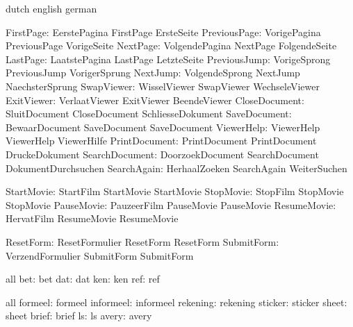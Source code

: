 \startvariables      dutch             english              german

         FirstPage:  EerstePagina      FirstPage            ErsteSeite
      PreviousPage:  VorigePagina      PreviousPage         VorigeSeite
          NextPage:  VolgendePagina    NextPage             FolgendeSeite
          LastPage:  LaatstePagina     LastPage             LetzteSeite
      PreviousJump:  VorigeSprong      PreviousJump         VorigerSprung
          NextJump:  VolgendeSprong    NextJump             NaechsterSprung
        SwapViewer:  WisselViewer      SwapViewer           WechseleViewer
        ExitViewer:  VerlaatViewer     ExitViewer           BeendeViewer
     CloseDocument:  SluitDocument     CloseDocument        SchliesseDokument
      SaveDocument:  BewaarDocument    SaveDocument         SaveDocument %
        ViewerHelp:  ViewerHelp        ViewerHelp           ViewerHilfe
     PrintDocument:  PrintDocument     PrintDocument        DruckeDokument
    SearchDocument:  DoorzoekDocument  SearchDocument       DokumentDurchsuchen
       SearchAgain:  HerhaalZoeken     SearchAgain          WeiterSuchen

        StartMovie:  StartFilm         StartMovie           StartMovie
         StopMovie:  StopFilm          StopMovie            StopMovie
        PauseMovie:  PauzeerFilm       PauseMovie           PauseMovie
       ResumeMovie:  HervatFilm        ResumeMovie          ResumeMovie

         ResetForm:  ResetFormulier    ResetForm            ResetForm   %
        SubmitForm:  VerzendFormulier  SubmitForm           SubmitForm  %

\stopvariables




\startconstants       all
                bet:  bet
                dat:  dat
                ken:  ken
                ref:  ref
\stopconstants

\startvariables       all
            formeel:  formeel
          informeel:  informeel
           rekening:  rekening
            sticker:  sticker
              sheet:  sheet
              brief:  brief
                 ls:  ls
              avery:  avery
\stopvariables


\endinput
